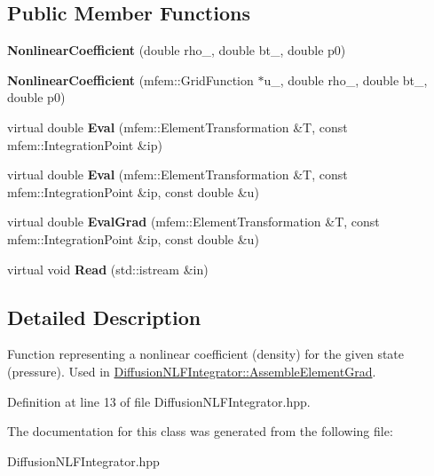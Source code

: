 \subsection*{Public Member Functions}
\begin{DoxyCompactItemize}
\item 
\mbox{\label{classNonlinearCoefficient_af9d31aa89191469de92d80e48637c64f}} 
{\bfseries Nonlinear\+Coefficient} (double rho\+\_\+, double bt\+\_\+, double p0)
\item 
\mbox{\label{classNonlinearCoefficient_a41db0c64a3dfcf1dbbea6630bd2ee193}} 
{\bfseries Nonlinear\+Coefficient} (mfem\+::\+Grid\+Function $\ast$u\+\_\+, double rho\+\_\+, double bt\+\_\+, double p0)
\item 
\mbox{\label{classNonlinearCoefficient_aa979c936709c19e3089aa9f60354225b}} 
virtual double {\bfseries Eval} (mfem\+::\+Element\+Transformation \&T, const mfem\+::\+Integration\+Point \&ip)
\item 
\mbox{\label{classNonlinearCoefficient_a1ea6e8519bc3eac3c0976f077596b71b}} 
virtual double {\bfseries Eval} (mfem\+::\+Element\+Transformation \&T, const mfem\+::\+Integration\+Point \&ip, const double \&u)
\item 
\mbox{\label{classNonlinearCoefficient_a55197365c8257b2cd5a75b87bbb8a36e}} 
virtual double {\bfseries Eval\+Grad} (mfem\+::\+Element\+Transformation \&T, const mfem\+::\+Integration\+Point \&ip, const double \&u)
\item 
\mbox{\label{classNonlinearCoefficient_abc449e82f5d99e5dbd9fcc128880bda0}} 
virtual void {\bfseries Read} (std\+::istream \&in)
\end{DoxyCompactItemize}


\subsection{Detailed Description}
Function representing a nonlinear coefficient (density) for the given state (pressure). Used in \hyperlink{classDiffusionNLFIntegrator_ac7b70b5cee3c880d52b03a87706ae8e3}{Diffusion\+N\+L\+F\+Integrator\+::\+Assemble\+Element\+Grad}. 

Definition at line 13 of file Diffusion\+N\+L\+F\+Integrator.\+hpp.



The documentation for this class was generated from the following file\+:\begin{DoxyCompactItemize}
\item 
Diffusion\+N\+L\+F\+Integrator.\+hpp\end{DoxyCompactItemize}

